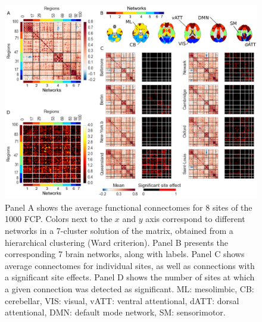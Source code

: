 \documentclass[authoryear]{elsarticle}
\begin{document}
\begin{figure}[htbp]
\begin{center}
\includegraphics[width=\linewidth]{../figures/connectome_multisite.png}
\end{center}
\caption[Connectome variability across sites]{
Panel A shows the average functional connectomes for 8 sites of the 1000 FCP. Colors next to the $x$ and $y$ axis correspond to different networks in a 7-cluster solution of the matrix, obtained from a hierarchical clustering (Ward criterion). Panel B presents the corresponding 7 brain networks, along with labels. Panel C shows average connectomes for individual sites, as well as connections with a significant site effects. Panel D shows the number of sites at which a given connection was detected as significant. ML: mesolimbic, CB: cerebellar, VIS: visual, vATT: ventral attentional, dATT: dorsal attentional, DMN: default mode network, SM: sensorimotor.
}
\label{fig_connectome_variability}
\end{figure}
\end{document}

